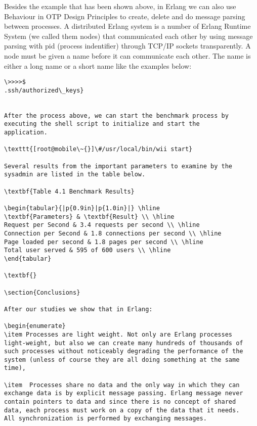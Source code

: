 \documentclass[final,
notitlepage,
narroweqnarray,
    inline,
    twoside,
]{ieee}
\begin{document}
Besides the example that has been shown above, in Erlang we can
also use Behaviour in OTP Design Principles to create, delete and
do message parsing between processes. A distributed Erlang system
is a number of Erlang Runtime System (we called them nodes) that
communicated each other by using message parsing with pid (process
indentifier) through TCP/IP sockets transparently. A node must be
given a name before it can communicate each other. The name is
either a long name or a short name like the examples below:
\begin{verbatim}
\>>>>$
.ssh/authorized\_keys}


After the process above, we can start the benchmark process by
executing the shell script to initialize and start the
application.

\texttt{[root@mobile\~{}]\#/usr/local/bin/wii start}

Several results from the important parameters to examine by the sysadmin are listed in the table below.

\textbf{Table 4.1 Benchmark Results}

\begin{tabular}{|p{0.9in}|p{1.0in}|} \hline
\textbf{Parameters} & \textbf{Result} \\ \hline
Request per Second & 3.4 requests per second \\ \hline
Connection per Second & 1.8 connections per second \\ \hline
Page loaded per second & 1.8 pages per second \\ \hline
Total user served & 595 of 600 users \\ \hline
\end{tabular}

\textbf{}

\section{Conclusions}

After our studies we show that in Erlang:

\begin{enumerate}
\item Processes are light weight. Not only are Erlang processes
light-weight, but also we can create many hundreds of thousands of
such processes without noticeably degrading the performance of the
system (unless of course they are all doing something at the same
time),

\item  Processes share no data and the only way in which they can
exchange data is by explicit message passing. Erlang message never
contain pointers to data and since there is no concept of shared
data, each process must work on a copy of the data that it needs.
All synchronization is performed by exchanging messages.


\end{verbatim}
\end{document}
